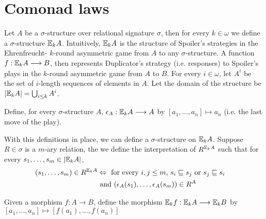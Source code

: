 \section{Comonad laws}
Let $A$ be a $\sigma$-structure over relational signature $\sigma$, then for every $k \in \omega$ we define a $\sigma$-structure ${\mathbb{E}_{k}A}$. Intuitively, ${\mathbb{E}_{k}A}$ is the structure of Spoiler's strategies in the Ehrenfreucht-{\Fraisse} $k$-round asymmetric game from $A$ to any $\sigma$-structure. A function $f:{\mathbb{E}_{k}A} \longrightarrow B$, then represents Duplicator's strategy (i.e. responses) to Spoiler's plays in the $k$-round asymmetric game from $A$ to $B$. For every $i \in \omega$, let $A^{i}$ be the set of $i$-length sequences of elements in $A$. Let the domain of the structure be $|{\mathbb{E}_{k}A}| = \bigcup_{i \leq k} A^{i}$. 
\begin{defn}
Define, for every $\sigma$-structure $A$, $\epsilon_{A}:{\mathbb{E}_{k}A} \longrightarrow A$ by $[a_{1},\dots,a_{n}] \mapsto a_{n}$ (i.e. the last move of the play). 
\label{defn:epsilonEF}
\end{defn}
With this definitions in place, we can define a $\sigma$-structure on ${\mathbb{E}_{k}A}$. Suppose $R \in \sigma$ is a $m$-ary relation, the we define the interpretation of $R^{{\mathbb{E}_{k}A}}$ such that for every $s_{1},\dots,s_{m} \in |{\mathbb{E}_{k}A}|$,
\begin{align}
(s_{1},\dots,s_{m}) \in R^{{\mathbb{E}_{k}A}} &\Leftrightarrow \text{ for every $i,j \leq m$, } s_{i} \sqsubseteq s_{j} \text{ or } s_{j} \sqsubseteq s_{i} & \label{eq:R1st} \\ 
&\text{ and } (\epsilon_{A}(s_{1}),\dots,\epsilon_{A}(s_{m})) \in R^{A} & \label{eq:R2nd}
\end{align}
\begin{defn}
Given a morphism $f:A \longrightarrow B$, define the morphism ${\mathbb{E}_{k}f}:{\mathbb{E}_{k}A} \longrightarrow {\mathbb{E}_{k}B}$ by $[a_{1},\dots,a_{n}] \mapsto [f(a_{1}),\dots,f(a_{n})]$
\label{defn:comonadMorphismEF}
\end{defn}
